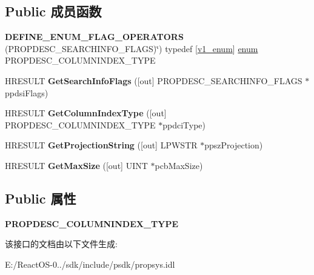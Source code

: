 \subsection*{Public 成员函数}
\begin{DoxyCompactItemize}
\item 
\mbox{\label{interface_i_property_description_search_info_a9fbc384e8587a04733b22070d472931b}} 
{\bfseries D\+E\+F\+I\+N\+E\+\_\+\+E\+N\+U\+M\+\_\+\+F\+L\+A\+G\+\_\+\+O\+P\+E\+R\+A\+T\+O\+RS} (P\+R\+O\+P\+D\+E\+S\+C\+\_\+\+S\+E\+A\+R\+C\+H\+I\+N\+F\+O\+\_\+\+F\+L\+A\+GS)\char`\"{}) typedef \mbox{[}\hyperlink{interfacev1__enum}{v1\+\_\+enum}\mbox{]} \hyperlink{interfaceenum}{enum} P\+R\+O\+P\+D\+E\+S\+C\+\_\+\+C\+O\+L\+U\+M\+N\+I\+N\+D\+E\+X\+\_\+\+T\+Y\+PE 
\item 
\mbox{\label{interface_i_property_description_search_info_a917fee87c5a16bd909ebecfea836d4f0}} 
H\+R\+E\+S\+U\+LT {\bfseries Get\+Search\+Info\+Flags} (\mbox{[}out\mbox{]} P\+R\+O\+P\+D\+E\+S\+C\+\_\+\+S\+E\+A\+R\+C\+H\+I\+N\+F\+O\+\_\+\+F\+L\+A\+GS $\ast$ppdsi\+Flags)
\item 
\mbox{\label{interface_i_property_description_search_info_a265a988d6ee30a4559c9dcc77a2868fc}} 
H\+R\+E\+S\+U\+LT {\bfseries Get\+Column\+Index\+Type} (\mbox{[}out\mbox{]} P\+R\+O\+P\+D\+E\+S\+C\+\_\+\+C\+O\+L\+U\+M\+N\+I\+N\+D\+E\+X\+\_\+\+T\+Y\+PE $\ast$ppdci\+Type)
\item 
\mbox{\label{interface_i_property_description_search_info_a9382b889072676f3e4d70cc9eaa1f544}} 
H\+R\+E\+S\+U\+LT {\bfseries Get\+Projection\+String} (\mbox{[}out\mbox{]} L\+P\+W\+S\+TR $\ast$ppsz\+Projection)
\item 
\mbox{\label{interface_i_property_description_search_info_a06b0a13ef3d83bd9455bca1b4a68d880}} 
H\+R\+E\+S\+U\+LT {\bfseries Get\+Max\+Size} (\mbox{[}out\mbox{]} U\+I\+NT $\ast$pcb\+Max\+Size)
\end{DoxyCompactItemize}
\subsection*{Public 属性}
\begin{DoxyCompactItemize}
\item 
\mbox{\label{interface_i_property_description_search_info_acd87556e98114883e086f2382b46d199}} 
{\bfseries P\+R\+O\+P\+D\+E\+S\+C\+\_\+\+C\+O\+L\+U\+M\+N\+I\+N\+D\+E\+X\+\_\+\+T\+Y\+PE}
\end{DoxyCompactItemize}


该接口的文档由以下文件生成\+:\begin{DoxyCompactItemize}
\item 
E\+:/\+React\+O\+S-\/0../sdk/include/psdk/propsys.\+idl\end{DoxyCompactItemize}

